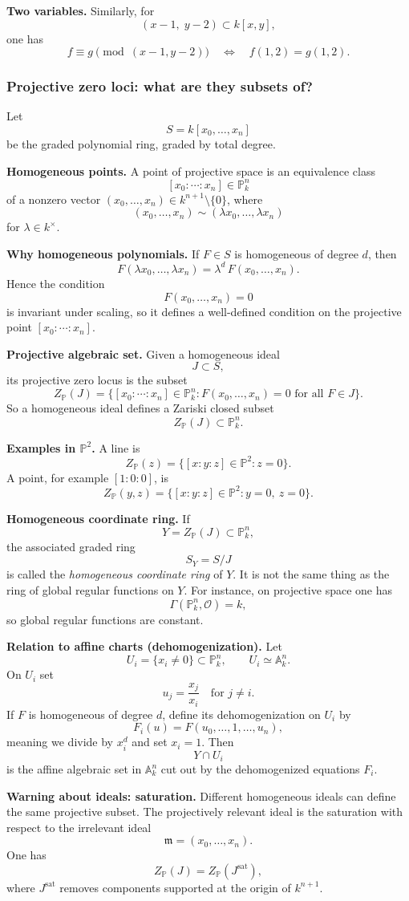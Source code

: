 \documentclass[12pt,a4paper]{article}
\theoremstyle{plain}
\theoremstyle{definition}      %
\begin{document}
\textbf{Two variables.}
Similarly, for
\[
(x-1,\;y-2)\subset k[x,y],
\]
one has
\[
f\equiv g \pmod{(x-1,y-2)}
\quad\Longleftrightarrow\quad
f(1,2)=g(1,2).
\]

\subsubsection*{Projective zero loci: what are they subsets of?}

Let
\[
S=k[x_0,\dots,x_n]
\]
be the graded polynomial ring, graded by total degree.

\textbf{Homogeneous points.}
A point of projective space is an equivalence class
\[
[x_0:\cdots:x_n]\in \mathbb P^n_k
\]
of a nonzero vector \((x_0,\dots,x_n)\in k^{n+1}\setminus\{0\}\), where
\[
(x_0,\dots,x_n)\sim (\lambda x_0,\dots,\lambda x_n)
\]
for \(\lambda\in k^\times\).

\textbf{Why homogeneous polynomials.}
If \(F\in S\) is homogeneous of degree \(d\), then
\[
F(\lambda x_0,\dots,\lambda x_n)=\lambda^d\,F(x_0,\dots,x_n).
\]
Hence the condition
\[
F(x_0,\dots,x_n)=0
\]
is invariant under scaling, so it defines a well-defined condition on the projective point \([x_0:\cdots:x_n]\).

\textbf{Projective algebraic set.}
Given a homogeneous ideal
\[
J\subset S,
\]
its projective zero locus is the subset
\[
Z_{\mathbb P}(J)
=
\bigl\{
[x_0:\cdots:x_n]\in \mathbb P^n_k
:
F(x_0,\dots,x_n)=0 \text{ for all } F\in J
\bigr\}.
\]
So a homogeneous ideal defines a Zariski closed subset
\[
Z_{\mathbb P}(J)\subset \mathbb P^n_k.
\]

\textbf{Examples in \(\mathbb P^2\).}
A line is
\[
Z_{\mathbb P}(z)=\{[x:y:z]\in\mathbb P^2 : z=0\}.
\]
A point, for example \([1:0:0]\), is
\[
Z_{\mathbb P}(y,z)=\{[x:y:z]\in\mathbb P^2 : y=0,\ z=0\}.
\]

\textbf{Homogeneous coordinate ring.}
If
\[
Y=Z_{\mathbb P}(J)\subset \mathbb P^n_k,
\]
the associated graded ring
\[
S_Y=S/J
\]
is called the \emph{homogeneous coordinate ring} of \(Y\).
It is not the same thing as the ring of global regular functions on \(Y\).
For instance, on projective space one has
\[
\Gamma(\mathbb P^n_k,\mathcal O)=k,
\]
so global regular functions are constant.

\textbf{Relation to affine charts (dehomogenization).}
Let
\[
U_i=\{x_i\neq 0\}\subset \mathbb P^n_k,
\qquad
U_i\simeq \mathbb A^n_k.
\]
On \(U_i\) set
\[
u_j=\frac{x_j}{x_i}
\quad\text{for } j\neq i.
\]
If \(F\) is homogeneous of degree \(d\), define its dehomogenization on \(U_i\) by
\[
F_i(u)=F(u_0,\dots,1,\dots,u_n),
\]
meaning we divide by \(x_i^d\) and set \(x_i=1\).
Then
\[
Y\cap U_i
\]
is the affine algebraic set in \(\mathbb A^n_k\) cut out by the dehomogenized equations \(F_i\).

\textbf{Warning about ideals: saturation.}
Different homogeneous ideals can define the same projective subset.
The projectively relevant ideal is the saturation with respect to the irrelevant ideal
\[
\mathfrak m=(x_0,\dots,x_n).
\]
One has
\[
Z_{\mathbb P}(J)=Z_{\mathbb P}(J^{\mathrm{sat}}),
\]
where \(J^{\mathrm{sat}}\) removes components supported at the origin of \(k^{n+1}\).


	
\end{document}

